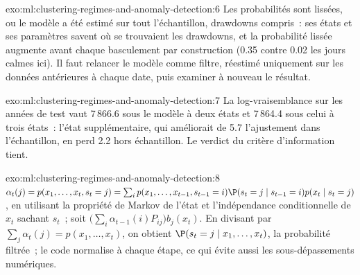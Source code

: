 \begin{solution}{exo:ml:clustering-regimes-and-anomaly-detection:6}
Les probabilités sont lissées, ou le modèle a été estimé sur tout l'échantillon, drawdowns compris~: ses états et ses paramètres savent
où se trouvaient les drawdowns, et la probabilité lissée augmente avant chaque basculement par construction (0.35 contre 0.02 les jours calmes
ici). Il faut relancer le modèle comme filtre, réestimé uniquement sur les données antérieures à chaque date, puis examiner à nouveau le résultat.
\end{solution}

\begin{solution}{exo:ml:clustering-regimes-and-anomaly-detection:7}
La log-vraisemblance sur les années de test vaut 7\,866.6 sous le modèle à deux états et 7\,864.4 sous celui à trois états~: l'état supplémentaire,
qui améliorait de 5.7 l'ajustement dans l'échantillon, en perd 2.2 hors échantillon. Le verdict du critère d'information tient.
\end{solution}

\begin{solution}{exo:ml:clustering-regimes-and-anomaly-detection:8}
$\alpha_t(j) = p(x_1,\dots,x_t, s_t = j) = \sum_ip(x_1,\dots,x_{t-1}, s_{t-1} = i)\P(s_t = j\mid s_{t-1} = i)p(x_t\mid s_t = j)$,
en utilisant la propriété de Markov de l'état et l'indépendance conditionnelle de $x_t$ sachant $s_t$~; soit
$\big(\sum_i\alpha_{t-1}(i)P_{ij}\big)b_j(x_t)$. En divisant par $\sum_j\alpha_t(j) = p(x_1,\dots,x_t)$, on obtient $\P(s_t = j\mid
x_1,\dots,x_t)$, la probabilité filtrée~; le code normalise à chaque étape, ce qui évite aussi les sous-dépassements numériques.
\end{solution}

